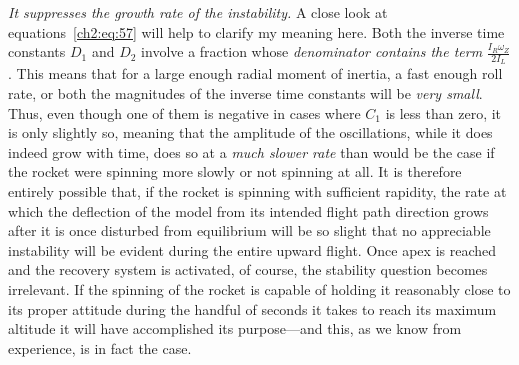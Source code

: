 \emph{It suppresses the growth rate of the instability.} A close look at
equations~\eqref{ch2:eq:57} will help to clarify my meaning here. Both the
inverse time constants $D_1$ and $D_2$ involve a fraction whose
\emph{denominator contains the term} $\frac{I_R\omega_Z}{2I_L}$. This means
that for a large enough radial moment of inertia, a fast enough roll rate, or
both the magnitudes of the inverse time constants will be \emph{very small}.
Thus, even though one of them is negative in cases where $C_1$ is less than
zero, it is only slightly so, meaning that the amplitude of the oscillations,
while it does indeed grow with time, does so at a \emph{much slower rate} than
would be the case if the rocket were spinning more slowly or not spinning at
all. It is therefore entirely possible that, if the rocket is spinning with
sufficient rapidity, the rate at which the deflection of the model from its
intended flight path direction grows after it is once disturbed from
equilibrium will be so slight that no appreciable instability will be evident
during the entire upward flight. Once apex is reached and the recovery system
is activated, of course, the stability question becomes irrelevant. If the
spinning of the rocket is capable of holding it reasonably close to its proper
attitude during the handful of seconds it takes to reach its maximum altitude
it will have accomplished its purpose---and this, as we know from experience,
is in fact the case.

